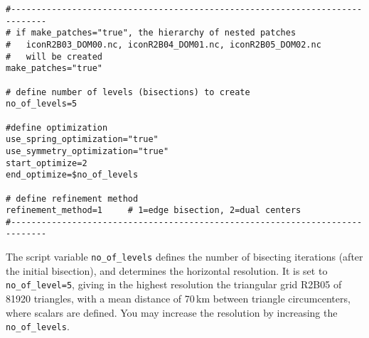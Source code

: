 \begin{small}
  \begin{verbatim}
#-----------------------------------------------------------------------------
# if make_patches="true", the hierarchy of nested patches
#   iconR2B03_DOM00.nc, iconR2B04_DOM01.nc, iconR2B05_DOM02.nc
#   will be created
make_patches="true" 

# define number of levels (bisections) to create
no_of_levels=5

#define optimization
use_spring_optimization="true"          
use_symmetry_optimization="true" 
start_optimize=2
end_optimize=$no_of_levels

# define refinement method
refinement_method=1     # 1=edge bisection, 2=dual centers
#-----------------------------------------------------------------------------
  \end{verbatim}
\end{small}


The script variable \verb+no_of_levels+ defines the number of bisecting iterations (after the initial bisection), and determines the horizontal resolution. It is set to \verb+no_of_level=5+, giving in the highest resolution the triangular grid R2B05 of 81920 triangles, with a mean distance of 70\,km between triangle circumcenters, where scalars are defined. You may increase the resolution by increasing the \verb+no_of_levels+.

